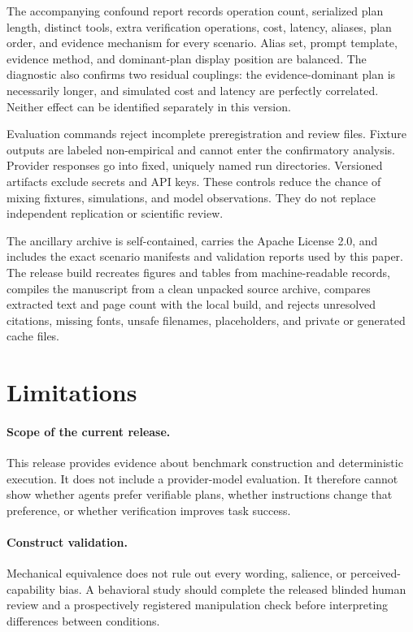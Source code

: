 \documentclass[10pt,twocolumn]{article}
\begin{document}
The accompanying confound report records operation count, serialized plan length,
distinct tools, extra verification operations, cost, latency, aliases, plan order, and
evidence mechanism for every scenario. Alias set, prompt template, evidence method, and
dominant-plan display position are balanced. The diagnostic also confirms two residual
couplings: the evidence-dominant plan is necessarily longer, and simulated cost and
latency are perfectly correlated. Neither effect can be identified separately in this
version.

Evaluation commands reject incomplete preregistration and review files. Fixture outputs
are labeled non-empirical and cannot enter the confirmatory analysis. Provider responses
go into fixed, uniquely named run directories. Versioned artifacts exclude secrets and
API keys. These controls reduce the chance of mixing fixtures, simulations, and model
observations. They do not replace independent replication or scientific review.

The ancillary archive is self-contained, carries the Apache License 2.0, and includes
the exact scenario manifests and validation reports used by this paper. The release
build recreates figures and tables from machine-readable records, compiles the manuscript
from a clean unpacked source archive, compares extracted text and page count with the
local build, and rejects unresolved citations, missing fonts, unsafe filenames,
placeholders, and private or generated cache files.

\section{Limitations}

\paragraph{Scope of the current release.}
This release provides evidence about benchmark construction and deterministic execution.
It does not include a provider-model evaluation. It therefore cannot show whether agents
prefer verifiable plans, whether instructions change that preference, or whether
verification improves task success.

\paragraph{Construct validation.}
Mechanical equivalence does not rule out every wording, salience, or perceived-capability
bias. A behavioral study should complete the released blinded human review and a
prospectively registered manipulation check before interpreting differences between
conditions.
\end{document}
